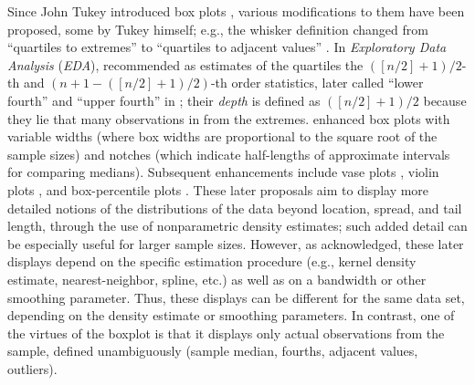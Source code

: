 \documentclass[oneside]{article}
\begin{document}
Since John Tukey introduced box plots \citep{tukey:1970,tukey72}, various modifications to them have been proposed, some by Tukey himself; e.g., the whisker definition changed from ``quartiles to extremes'' \citep{tukey72} to ``quartiles to adjacent values'' \citep{eda}. In \textit{Exploratory Data Analysis} (\textit{EDA}), \citet{eda} recommended as estimates of the quartiles the $([n/2] + 1)/2$-th and $(n + 1 - ([n/2] + 1)/2)$-th order statistics, later called ``lower fourth'' and ``upper fourth'' in \citet{ureda}; their \textit{depth} is defined as $([n/2] + 1)/2$ because they lie that many observations in from the extremes. \citet{variations.boxplots} enhanced box plots with variable widths (where box widths are proportional to the square root of the sample sizes) and notches (which indicate half-lengths of approximate intervals for comparing medians). Subsequent enhancements include vase plots \citep{vase}, violin plots \citep{violin}, and box-percentile plots \citep{box.percentiles}. These later proposals aim to display more detailed notions of the distributions of the data beyond location, spread, and tail length, through the use of nonparametric density estimates; such added detail can be especially useful for larger sample sizes. However, as \citet{vase} acknowledged, these later displays depend on the specific estimation procedure (e.g., kernel density estimate, nearest-neighbor, spline, etc.) as well as on a bandwidth or other smoothing parameter. Thus, these displays can be different for the same data set, depending on the density estimate or smoothing parameters. In contrast, one of the virtues of the boxplot is that it displays only actual observations from the sample, defined unambiguously (sample median, fourths, adjacent values, outliers).
\end{document}
